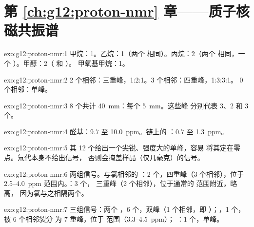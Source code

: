 \section*{第 \ref{ch:g12:proton-nmr} 章——质子核磁共振谱}

\begin{solution}{exo:g12:proton-nmr:1}
甲烷：1。乙烷：1（两个  相同）。丙烷：2（两个
 相同，一个 ）。甲醇：2（ 和 ）。
甲氧基甲烷：1。
\end{solution}

\begin{solution}{exo:g12:proton-nmr:2}
2 个相邻：三重峰，1:2:1。3 个相邻：四重峰，1:3:3:1。
0 个相邻：单峰。
\end{solution}

\begin{solution}{exo:g12:proton-nmr:3}
8 个共计 \qty{40}{mm}：每个 \qty{5}{mm}。这些峰
分别代表 3、2 和 3 个。
\end{solution}

\begin{solution}{exo:g12:proton-nmr:4}
醛基：9.7 至 \qty{10.0}{ppm}。链上的 ：0.7 至
\qty{1.3}{ppm}。
\end{solution}

\begin{solution}{exo:g12:proton-nmr:5}
其 12 个给出一个尖锐、强度大的单峰，容易
将其定在零点。氘代本身不给出信号，
否则会掩盖样品（仅几毫克）的信号。
\end{solution}

\begin{solution}{exo:g12:proton-nmr:6}
两组信号。与氯相邻的 ：2 个，四重峰（3
个相邻），位于 2.5--\qty{4.0}{ppm} 范围内。：3 个，
三重峰（2 个相邻），位于通常的  范围附近，略高，
因为氯与之相隔两个。
\end{solution}

\begin{solution}{exo:g12:proton-nmr:7}
三组信号：两个 ，6 个，双峰（1
个相邻，即 ）；，1 个，被 6 个相邻裂分
为 7 重峰，位于  范围（3.3--\qty{4.5}{ppm}）；
：1 个，单峰。
\end{solution}


